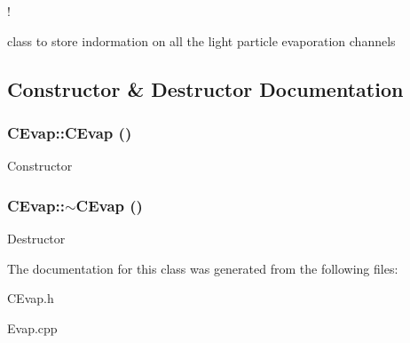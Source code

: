 !

class to store indormation on all the light particle evaporation channels 



\subsection{Constructor \& Destructor Documentation}
\subsubsection{\setlength{\rightskip}{0pt plus 5cm}CEvap::CEvap ()\hspace{0.3cm}{\tt  [protected]}}\label{classCEvap_5e9710c313ea5ce45cdc50d09ac8e947}


Constructor 
\subsubsection{\setlength{\rightskip}{0pt plus 5cm}CEvap::$\sim$CEvap ()}\label{classCEvap_759413aca22735496f2bb36c61c5fce4}


Destructor 

The documentation for this class was generated from the following files:\begin{CompactItemize}
\item 
CEvap.h\item 
Evap.cpp\end{CompactItemize}
